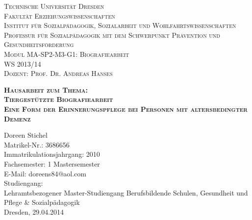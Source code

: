 \begin{titlepage}
\begin{flushleft}
\Large
\scshape
Technische Universität Dresden\\
\normalsize
\upshape
Fakultät Erziehungswissenschaften\\
Institut für Sozialpädagogik, Sozialarbeit und Wohlfahrtswissenschaften\\
Professur für Sozialpädagogik mit dem Schwerpunkt Prävention und Gesundheitsförderung\\[0,5cm]
Modul MA-SP2-M3-G1: Biografiearbeit\\[0,5cm]
WS 2013/14\\
Dozent: Prof. Dr. Andreas Hanses\\
\end{flushleft}

\vfill

\begin{center}
\Huge
\scshape
\bfseries
Hausarbeit zum Thema:\\[1,0cm]
\Large
\mdseries
Tiergestützte Biografiearbeit\\[0,5cm]
Eine Form der Erinnerungspflege bei Personen mit altersbedingter Demenz\\
\end{center}

\vfill

\begin{flushleft}
Doreen Stichel\\
Matrikel-Nr.: 3686656\\
Immatrikulationsjahrgang: 2010\\
Fachsemester: 1 Mastersemester\\
E-Mail: doreens84@aol.com\\[0,5cm]
Studiengang:\\
Lehramtsbezogener Master-Studiengang Berufsbildende Schulen, Gesundheit und Pflege \& Sozialpädagogik\\[0,5cm]
Dresden, 29.04.2014
\end{flushleft}

\end{titlepage}